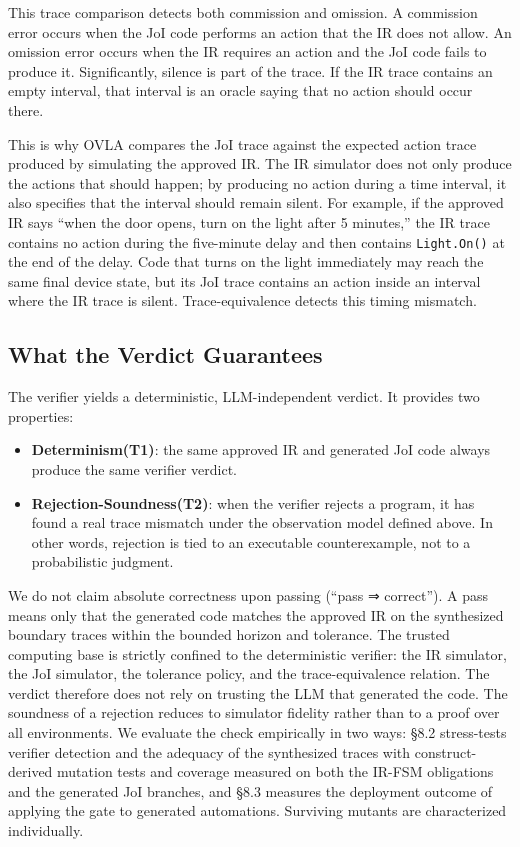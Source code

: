 \documentclass[sigconf,nonacm,anonymous,review]{acmart}
\begin{document}
This trace comparison detects both commission and omission. A commission error occurs when the JoI code performs an action that the IR does not allow. An omission error occurs when the IR requires an action and the JoI code fails to produce it. %
Significantly, silence is part of the trace. If the IR trace contains an empty interval, that interval is an oracle saying that no action should occur there.

This is why OVLA compares the JoI trace against the expected action trace produced by simulating the approved IR. The IR simulator does not only produce the actions that should happen; by producing no action during a time interval, it also specifies that the interval should remain silent. For example, if the approved IR says ``when the door opens, turn on the light after 5 minutes,'' the IR trace contains no action during the five-minute delay and then contains \texttt{Light.On()} at the end of the delay. Code that turns on the light immediately may reach the same final device state, but its JoI trace contains an action inside an interval where the IR trace is silent. Trace-equivalence detects this timing mismatch.

\subsection{What the Verdict Guarantees}

The verifier yields a deterministic, LLM-independent verdict. It provides two properties:
\begin{itemize}
\item \textbf{Determinism(T1)}: the same approved IR and generated JoI code always produce the same verifier verdict. 
\item \textbf{Rejection-Soundness(T2)}: when the verifier rejects a program, it has found a real trace mismatch under the observation model defined above. In other words, rejection is tied to an executable counterexample, not to a probabilistic judgment.
\end{itemize}

We do not claim absolute correctness upon passing (``pass ⇒ correct''). A pass means only that the generated code matches the approved IR on the synthesized boundary traces within the bounded horizon and tolerance. The trusted computing base is strictly confined to the deterministic verifier: the IR simulator, the JoI simulator, the tolerance policy, and the trace-equivalence relation. The verdict therefore does not rely on trusting the LLM that generated the code. The soundness of a rejection reduces to simulator fidelity rather than to a proof over all environments. We evaluate the check empirically in two ways: \S8.2 stress-tests verifier detection and the adequacy of the synthesized traces with construct-derived mutation tests and coverage measured on both the IR-FSM obligations and the generated JoI branches, and \S8.3 measures the deployment outcome of applying the gate to generated automations. Surviving mutants are characterized individually.
\end{document}

